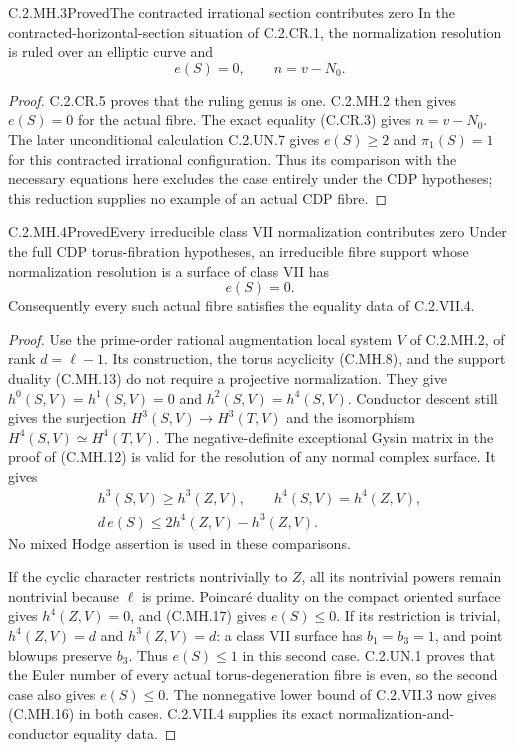 \begin{statement}{C.2.MH.3}{Proved}{The contracted irrational section contributes zero}
In the contracted-horizontal-section situation of
C.2.CR.1, the normalization resolution is ruled over
an elliptic curve and
\[
                    e(S)=0,\qquad n=v-N_0.
 \tag{C.MH.15}
\]
\end{statement}
\begin{proof}
C.2.CR.5 proves that the ruling genus is one.
C.2.MH.2 then gives $e(S)=0$ for the actual fibre.
The exact equality (C.CR.3) gives $n=v-N_0$.
The later unconditional calculation C.2.UN.7
gives $e(S)\ge2$ and $\pi_1(S)=1$ for this
contracted irrational configuration. Thus its
comparison with the necessary equations here
excludes the case entirely under the CDP
hypotheses; this reduction supplies no example
of an actual CDP fibre.
\end{proof}

\begin{statement}{C.2.MH.4}{Proved}{Every irreducible class VII normalization contributes zero}
Under the full CDP torus-fibration hypotheses, an
irreducible fibre support whose normalization resolution
is a surface of class VII has
\[
                              e(S)=0.
 \tag{C.MH.16}
\]
Consequently every such actual fibre satisfies the
equality data of C.2.VII.4.
\end{statement}
\begin{proof}
Use the prime-order rational augmentation local system
$V$ of C.2.MH.2, of rank $d=\ell-1$. Its construction,
the torus acyclicity (C.MH.8), and the support duality
(C.MH.13) do not require a projective normalization.
They give $h^0(S,V)=h^1(S,V)=0$ and
$h^2(S,V)=h^4(S,V)$. Conductor descent still gives the
surjection $H^3(S,V)\to H^3(T,V)$ and the isomorphism
$H^4(S,V)\simeq H^4(T,V)$. The negative-definite
exceptional Gysin matrix in the proof of (C.MH.12)
is valid for the resolution of any normal complex
surface. It gives
\[
 \begin{gathered}
 h^3(S,V)\ge h^3(Z,V),\qquad h^4(S,V)=h^4(Z,V),\\
 d\,e(S)\le 2h^4(Z,V)-h^3(Z,V).
 \end{gathered}
 \tag{C.MH.17}
\]
No mixed Hodge assertion is used in these comparisons.

If the cyclic character restricts nontrivially to $Z$,
all its nontrivial powers remain nontrivial because
$\ell$ is prime. Poincar\'e duality on the compact
oriented surface gives $h^4(Z,V)=0$, and (C.MH.17)
gives $e(S)\le0$. If its restriction is trivial,
$h^4(Z,V)=d$ and $h^3(Z,V)=d$: a class VII surface
has $b_1=b_3=1$, and point blowups preserve $b_3$.
Thus $e(S)\le1$ in this second case. C.2.UN.1 proves
that the Euler number of every actual torus-degeneration
fibre is even, so the second case also gives
$e(S)\le0$. The nonnegative lower bound of C.2.VII.3
now gives (C.MH.16) in both cases. C.2.VII.4 supplies
its exact normalization-and-conductor equality data.
\end{proof}
